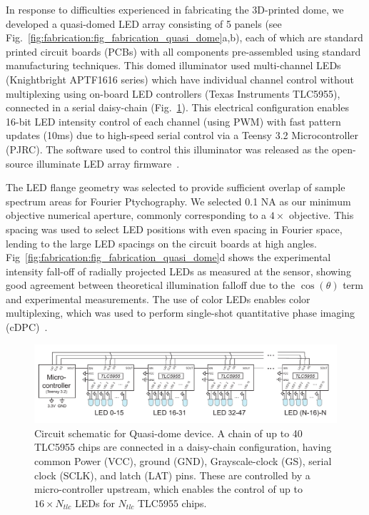 In response to difficulties experienced in fabricating the 3D-printed dome, we developed a quasi-domed LED array consisting of 5 panels (see Fig.~\ref{fig:fabrication:fig_fabrication_quasi_dome}a,b), each of which are standard printed circuit boards (PCBs) with all components pre-assembled using standard manufacturing techniques. This domed illuminator used multi-channel LEDs (Knightbright APTF1616 series) which have individual channel control without multiplexing using on-board LED controllers (Texas Instruments TLC5955), connected in a serial daisy-chain (Fig.~\ref{fig:fabrication_dome_circuit}). This electrical configuration enables 16-bit LED intensity control of each channel (using PWM) with fast pattern updates (10ms) due to high-speed serial control via a Teensy 3.2 Microcontroller (PJRC). The software used to control this illuminator was released as the open-source illuminate LED array firmware~\cite{illuminate}.

The LED flange geometry was selected to provide sufficient overlap of sample spectrum areas for Fourier Ptychography. We selected 0.1 NA as our minimum objective numerical aperture, commonly corresponding to a $4\times$ objective. This spacing was used to select LED positions with even spacing in Fourier space, lending to the large LED spacings on the circuit boards at high angles. Fig~\ref{fig:fabrication:fig_fabrication_quasi_dome}d shows the experimental intensity fall-off of radially projected LEDs as measured at the sensor, showing good agreement between theoretical illumination falloff due to the $\cos(\theta)$ term and experimental measurements. The use of color LEDs enables color multiplexing, which was used to perform single-shot quantitative phase imaging (cDPC)~\cite{PhillipsChen17cDPC}.

\begin{figure}
    \centering
    \includegraphics[width=\textwidth]{figures/fig_fabrication_slow_circuit.pdf}
    \caption{Circuit schematic for Quasi-dome device. A chain of up to 40 TLC5955 chips are connected in a daisy-chain configuration, having common Power (VCC), ground (GND), Grayscale-clock (GS), serial clock (SCLK), and latch (LAT) pins. These are controlled by a micro-controller upstream, which enables the control of up to $16 \times N_{tlc}$ LEDs for $N_{tlc}$ TLC5955 chips.}\label{fig:fabrication_dome_circuit}
\end{figure}

